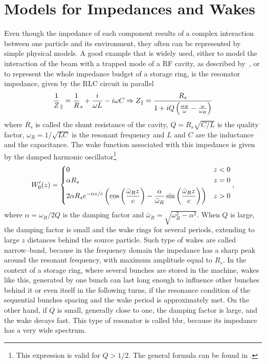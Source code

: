\section{Models for Impedances and Wakes}

    Even though the impedance of each component results of a complex interaction between one particle and its environment, they often can be represented by simple physical models. A good example that is widely used, either to model the interaction of the beam with a trapped mode of a RF cavity, as described by~, or to represent the whole impedance budget of a storage ring, is the resonator impedance, given by the RLC circuit in parallel
    \begin{align}\label{eq:long_resonator_impedance}
        \frac1Z_\parallel =  \frac1R_s + \frac{i}{\omega L} - i\omega C \Rightarrow
        Z_\parallel = \frac{R_s}{1 + iQ\left(\frac{\omega_R}{\omega}-\frac{\omega}{\omega_R}\right)}
    \end{align}
    where $R_s$ is called the shunt resistance of the cavity, $Q = R_s\sqrt{C/L}$ is the quality factor, $\omega_R = 1/\sqrt{LC}$ is the resonant frequency and  $L$ and $C$ are the inductance and the capacitance. The wake function associated with this impedance is given by the damped harmonic oscillator\footnote{\label{ftn:resonator} This expression is valid for $Q>1/2$. The general formula can be found in .}
    \begin{align}
        W'_0(z) =
        \begin{dcases}
            0 & z < 0 \\
            \alpha R_s & z = 0 \\
            2\alpha R_se^{-\alpha z/c}\left(\cos\left(\frac{\bar{\omega}_Rz}{c}\right)-
                                    \frac{\alpha}{\bar{\omega}_R}
                                        \sin\left(\frac{\bar{\omega}_Rz}{c}\right)\right) & z>0
        \end{dcases},
    \end{align}
    where $\alpha = \omega_R/2Q$ is the damping factor and $\bar{\omega}_R=\sqrt{\omega_R^2-\alpha^2}$. When $Q$ is large, the damping factor is small and the wake rings for several periods, extending to large $z$ distances behind the source particle. Such type of wakes are called narrow--band, because in the frequency domain the impedance has a sharp peak around the resonant frequency, with maximum amplitude equal to $R_s$. In the context of a storage ring, where several bunches are stored in the machine, wakes like this, generated by one bunch can last long enough to influence other bunches behind it or even itself in the following turns, if the resonance condition of the sequential bunches spacing and the wake period is approximately met. On the other hand, if $Q$ is small, generally close to one, the damping factor is large, and the wake decays fast. This type of resonator is called \gls{bbr}, because its impedance has a very wide spectrum.

